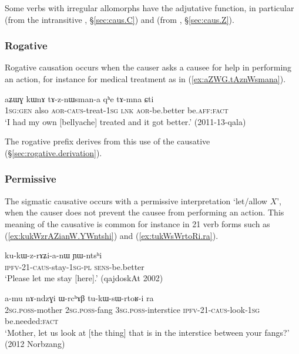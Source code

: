 Some verbs with irregular allomorphs have the adjutative function, in  particular  (from the intransitive , §\ref{sec:caus.C}) and   (from , §\ref{sec:caus.Z}).

\subsubsection{Rogative} \label{sec:sig.caus.rogative}
Rogative causation occurs when the causer asks a causee for help in performing an action, for instance for medical treatment as in (\ref{ex:aZWG.tAznWsmana}). 

\begin{exe}
\ex \label{ex:aZWG.tAznWsmana}
\gll aʑɯɣ kɯnɤ tɤ-z-nɯsman-a qʰe tɤ-mna ɕti \\
\textsc{1sg}:\textsc{gen} also \textsc{aor}-\textsc{caus}-treat-\textsc{1sg} \textsc{lnk} \textsc{aor}-be.better be.\textsc{aff}:\textsc{fact} \\
\glt `I had my own [bellyache] treated and it got better.' (2011-13-qala)
\end{exe}

The rogative  prefix derives from this use of the causative (§\ref{sec:rogative.derivation}). 

\subsubsection{Permissive} \label{sec:sig.caus.permissive} 
The sigmatic causative occurs with a permissive interpretation `let/allow $X$', when the causer does not prevent the causee from performing an action. This meaning of the causative is common for instance in 2\fl{}1 verb forms such as (\ref{ex:kukWzrAZianW.YWntshi}) and (\ref{ex:tukWsWrtoRi.ra}). 

\begin{exe}
\ex \label{ex:kukWzrAZianW.YWntshi}
\gll ku-kɯ-z-rɤʑi-a-nɯ ɲɯ-ntsʰi \\
\textsc{ipfv}-2\fl{}1-\textsc{caus}-stay-\textsc{1sg}-\textsc{pl} \textsc{sens}-be.better \\
\glt `Please let me stay [here].' (qajdoskAt 2002) 
\end{exe}
 
\begin{exe}
\ex \label{ex:tukWsWrtoRi.ra}
\gll a-mu nɤ-ndzɣi ɯ-rcʰɤβ tu-kɯ-sɯ-rtoʁ-i ra \\
\textsc{2sg}.\textsc{poss}-mother \textsc{2sg}.\textsc{poss}-fang \textsc{3sg}.\textsc{poss}-interstice \textsc{ipfv}-2\fl{}1-\textsc{caus}-look-\textsc{1sg} be.needed:\textsc{fact} \\
\glt `Mother, let us look at [the thing] that is in the interstice between your fangs?' (2012 Norbzang)
\end{exe}

